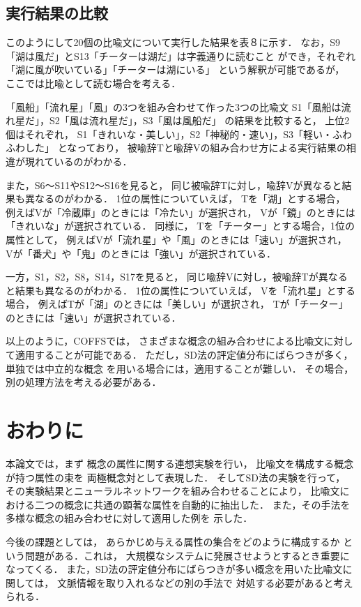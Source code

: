 \subsection{実行結果の比較}

このようにして20個の比喩文について実行した結果を表８に示す．
なお，S9「湖は風だ」とS13「チーターは湖だ」は字義通りに読むこと
ができ，それぞれ「湖に風が吹いている」「チーターは湖にいる」
という解釈が可能であるが，
ここでは比喩として読む場合を考える．

「風船」「流れ星」「風」の3つを組み合わせて作った3つの比喩文
S1「風船は流れ星だ」，S2「風は流れ星だ」，S3「風は風船だ」
の結果を比較すると，
上位2個はそれぞれ，
S1「きれいな・美しい」，S2「神秘的・速い」，S3「軽い・ふわふわした」
となっており，
被喩辞Tと喩辞Vの組み合わせ方による実行結果の相違が現れているのがわかる．

また，S6〜S11やS12〜S16を見ると，  
同じ被喩辞Tに対し，喩辞Vが異なると結果も異なるのがわかる．
1位の属性についていえば，
Tを「湖」とする場合，
例えばVが「冷蔵庫」のときには「冷たい」が選択され，
Vが「鏡」のときには「きれいな」が選択されている．
同様に，
Tを「チーター」とする場合，1位の属性として，
例えばVが「流れ星」や「風」のときには「速い」が選択され，
Vが「番犬」や「鬼」のときには「強い」が選択されている．

一方，S1，S2，S8，S14，S17を見ると，
同じ喩辞Vに対し，被喩辞Tが異なると結果も異なるのがわかる．
1位の属性についていえば，
Vを「流れ星」とする場合，
例えばTが「湖」のときには「美しい」が選択され，
Tが「チーター」のときには「速い」が選択されている．

以上のように，COFFSでは，
さまざまな概念の組み合わせによる比喩文に対して適用することが可能である．
ただし，SD法の評定値分布にばらつきが多く，単独では中立的な概念
を用いる場合には，適用することが難しい．
その場合，別の処理方法を考える必要がある．


\section{おわりに}

本論文では，まず
概念の属性に関する連想実験を行い，
比喩文を構成する概念が持つ属性の束を
両極概念対として表現した．
そしてSD法の実験を行って，
その実験結果とニューラルネットワークを組み合わせることにより，
比喩文における二つの概念に共通の顕著な属性を自動的に抽出した．
また，その手法を多様な概念の組み合わせに対して適用した例を
示した．

今後の課題としては，
あらかじめ与える属性の集合をどのように構成するか
という問題がある．これは，
大規模なシステムに発展させようとするとき重要になってくる．
また，SD法の評定値分布にばらつきが多い概念を用いた比喩文に関しては，
文脈情報を取り入れるなどの別の手法で
対処する必要があると考えられる．


